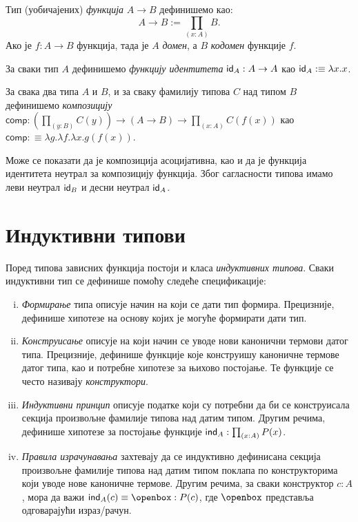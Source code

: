 \documentclass[12pt,oneside]{memoir}
\begin{document}
\begin{definition}
    Тип (уобичајених) \emph{функција} $A \to B$ дефинишемо као:
    \[A \to B:= \prod_{(x:A)} B.\]
    Ако је $f : A \to B$ функција, тада је $A$ \emph{домен}, а $B$ \emph{кодомен} функције $f$. 
\end{definition}

\begin{definition}
\label{def:id}
    За сваки тип $A$ дефинишемо \emph{функцију идентитета} $\mathsf{id}_{A} : A \to A$ као $\mathsf{id}_{A} :\equiv \lambda x.x$.
\end{definition}

\begin{definition}
\label{def:comp}
    За свака два типа $A$ и $B$, и за сваку фамилију типова $C$ над типом $B$ дефинишемо \emph{композицију} $\mathsf{comp} : (\prod_{(y : B)} C (y)) \to (A \to B) \to \prod_{(x : A)} C (f (x))$ као $\mathsf{comp} :\equiv \lambda g.\lambda f.\lambda x.g(f(x))$.
\end{definition}
Може се показати да је композиција асоцијативна, као и да је функција идентитета неутрал за композицију функција. Због сагласности типова имамо леви неутрал $\mathsf{id}_{B}$ и десни неутрал $\mathsf{id}_{A}$.

\section{Индуктивни типови}
\label{sec:indtyp}

Поред типова зависних функција постоји и класа \emph{индуктивних типова}. Сваки индуктивни тип се дефинише помоћу следеће спецификације: 

\begin{enumerate}[(i)]
    \item{\emph{Формирање} типа описује начин на који се дати тип формира. Прецизније, дефинише хипотезе на основу којих је могуће формирати дати тип.}
    \item{\emph{Конструисање} описује на који начин се уводе нови канонични термови датог типа. Прецизније, дефинише функције које конструишу каноничне термове датог типа, као и потребне хипотезе за њихово постојање. Те функције се често називају \emph{конструктори}.}
    \item{\emph{Индуктивни принцип} описује податке који су потребни да би се конструисала секција произвољне фамилије типова над датим типом. Другим речима, дефинише хипотезе за постојање функције $\mathsf{ind}_{A} : \prod_{(x : A)} P(x)$.}
    \item{\emph{Правила израчунавања} захтевају да се индуктивно дефинисана секција произвољне фамилије типова над датим типом поклапа по конструкторима који уводе нове каноничне термове. Другим речима, за сваки конструктор $c : A$, мора да важи $\ind{A}(c) \equiv \openbox : P(c)$, где $\openbox$ представља одговарајући израз/рачун.}
\end{enumerate}
\end{document}
